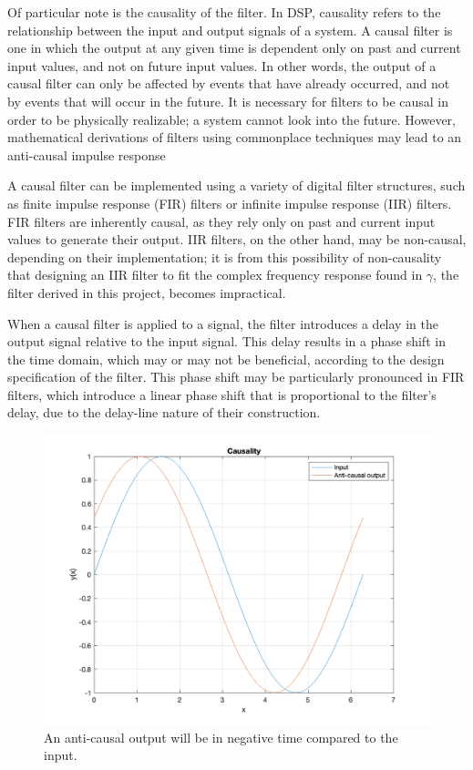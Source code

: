 \documentclass{report}
\begin{document}
        Of particular note is the causality of the filter.
        In DSP, causality refers to the relationship between the input and output signals of a system.
        A causal filter is one in which the output at any given time is dependent only on past and current input values, and not on future input values.
        In other words, the output of a causal filter can only be affected by events that have already occurred, and not by events that will occur in the future.
        It is necessary for filters to be causal in order to be physically realizable; a system cannot look into the future.
        However, mathematical derivations of filters using commonplace techniques may lead to an anti-causal impulse response

        A causal filter can be implemented using a variety of digital filter structures, such as finite impulse response (FIR) filters or infinite impulse response (IIR) filters.
        FIR filters are inherently causal, as they rely only on past and current input values to generate their output.
        IIR filters, on the other hand, may be non-causal, depending on their implementation; it is from this possibility of non-causality that designing an IIR filter to fit the complex frequency response found in $\gamma$, the filter derived in this project, becomes impractical. 

        When a causal filter is applied to a signal, the filter introduces a delay in the output signal relative to the input signal.
        This delay results in a phase shift in the time domain, which may or may not be beneficial, according to the design specification of the filter.
        This phase shift may be particularly pronounced in FIR filters, which introduce a linear phase shift that is proportional to the filter's delay, due to the delay-line nature of their construction.

        \begin{figure}[H]
            \centering
            \includegraphics[width = 0.6\linewidth]{figs/causality.png}
            \caption{An anti-causal output will be in negative time compared to the input.}
            \label{causality}
        \end{figure}
        
\end{document}
